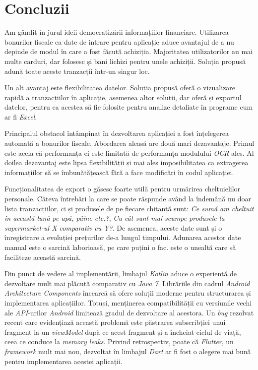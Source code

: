 \chapter*{Concluzii}\label{conclusions}

Am gândit \AppName{} în jurul ideii democratizării informațiilor financiare. Utilizarea bonurilor fiscale ca date de intrare pentru aplicație aduce avantajul de a nu depinde de modul în care a fost făcută achiziția. Majoritatea utilizatorilor au mai multe carduri, dar folosesc și bani lichizi pentru unele achiziții. Soluția propusă adună toate aceste tranzacții într-un singur loc.

Un alt avantaj este flexibilitatea datelor. Soluția propusă oferă o vizualizare rapidă a tranzacțiilor în aplicație, asemenea altor soluții, dar oferă și exportul datelor, pentru ca acestea să fie folosite pentru analize detaliate în programe cum ar fi \emph{Excel}.

Principalul obstacol întâmpinat în dezvoltarea aplicației a fost înțelegerea automată a bonurilor fiscale. Abordarea aleasă are două mari dezavantaje. Primul este acela că performanța ei este limitată de performanța modulului \emph{OCR} ales. Al doilea dezavantaj este lipsa flexibilității și mai ales imposibilitatea ca extragerea informațiilor să se îmbunătățească fără a face modificări în codul aplicației.

Funcționalitatea de export o găsesc foarte utilă pentru urmărirea cheltuielilor personale. Câteva întrebări la care se poate răspunde având la îndemână nu doar lista tranzacțiilor, ci și produsele de pe fiecare chitanță sunt: \emph{Ce sumă am cheltuit în această lună pe apă, pâine etc.?}, \emph{Cu cât sunt mai scumpe produsele la supermarket-ul X comparativ cu Y?}. De asemenea, aceste date sunt și o înregistrare a evoluției prețurilor de-a lungul timpului. Adunarea acestor date manual este o sarcină laborioasă, pe care puțini o fac. \AppName este o unealtă care să faciliteze această sarcină.

Din punct de vedere al implementării, limbajul \emph{Kotlin} aduce o experiență de dezvoltare mult mai plăcută comparativ cu \emph{Java 7}. Librăriile din cadrul \emph{Android Architecture Components} încearcă să ofere soluții moderne pentru structurarea și implementarea aplicațiilor. Totuși, menținerea compatibilității cu versiunile vechi ale \emph{API}-urilor \emph{Android} limitează gradul de dezvoltare al acestora. Un \emph{bug} rezolvat recent care evidențiază această problemă este păstrarea subscribției unui fragment la un \emph{viewModel} după ce acest fragment și-a încheiat ciclul de viață, ceea ce conduce la \emph{memory leaks}. Privind retrospectiv, poate că \emph{Flutter}, un \emph{framework} mult mai nou, dezvoltat în limbajul \emph{Dart} ar fi fost o alegere mai bună pentru implementarea acestei aplicații.

